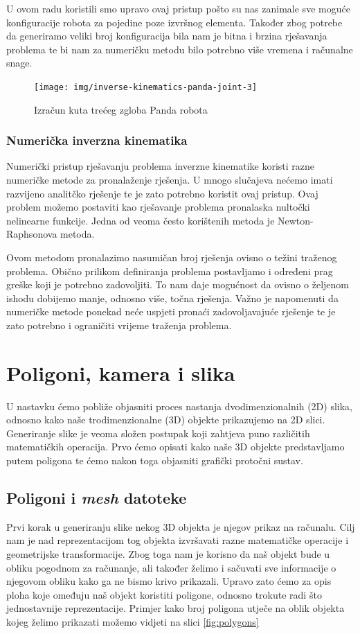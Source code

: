 \documentclass[times, utf8, diplomskirad]{fer}
\begin{document}
U ovom radu koristili smo upravo ovaj pristup pošto su nas zanimale sve moguće konfiguracije robota za pojedine poze izvršnog elementa.
Također zbog potrebe da generiramo veliki broj konfiguracija bila nam je bitna i brzina rješavanja problema te bi nam za numeričku metodu bilo potrebno više vremena i računalne snage.
\begin{figure}[H]
    \centering
    \texttt{[image: img/inverse-kinematics-panda-joint-3]}
    \caption{Izračun kuta trećeg zgloba Panda robota}
    \label{fig:inv-kin-panda-joint-3}
\end{figure}

\subsection{Numerička inverzna kinematika}
Numerički pristup rješavanju problema inverzne kinematike koristi razne numeričke metode za pronalaženje rješenja.
U mnogo slučajeva nećemo imati razvijeno analitčko rješenje te je zato potrebno koristit ovaj pristup.
Ovaj problem možemo postaviti kao rješavanje problema pronalaska nultočki nelinearne funkcije.
Jedna od veoma često korištenih metoda je Newton-Raphsonova metoda.

Ovom metodom pronalazimo nasumičan broj rješenja ovisno o težini traženog problema.
Obično prilikom definiranja problema postavljamo i određeni prag greške koji je potrebno zadovoljiti.
To nam daje mogućnost da ovisno o željenom ishodu dobijemo manje, odnosno više, točna rješenja.
Važno je napomenuti da numeričke metode ponekad neće uspjeti pronaći zadovoljavajuće rješenje te je zato potrebno i ograničiti vrijeme traženja problema.


\chapter{Poligoni, kamera i slika}
\label{pog:kamera-i-slika}
U nastavku ćemo pobliže objasniti proces nastanja dvodimenzionalnih (2D) slika, odnosno kako naše trodimenzionalne (3D) objekte prikazujemo na 2D slici.
Generiranje slike je veoma složen postupak koji zahtjeva puno različitih matematičkih operacija.
Prvo ćemo opisati kako naše 3D objekte predstavljamo putem poligona te ćemo nakon toga objasniti grafički protočni sustav.

\section{Poligoni i \textit{mesh} datoteke}
Prvi korak u generiranju slike nekog 3D objekta je njegov prikaz na računalu.
Cilj nam je nad reprezentacijom tog objekta izvršavati razne matematičke operacije i geometrijske transformacije.
Zbog toga nam je korisno da naš objekt bude u obliku pogodnom za računanje, ali također želimo i sačuvati sve informacije o njegovom obliku kako ga ne bismo krivo prikazali.
Upravo zato ćemo za opis ploha koje omeđuju naš objekt koristiti poligone, odnosno trokute radi što jednostavnije reprezentacije.
Primjer kako broj poligona utječe na oblik objekta kojeg želimo prikazati možemo vidjeti na slici \ref{fig:polygons}
\end{document}
